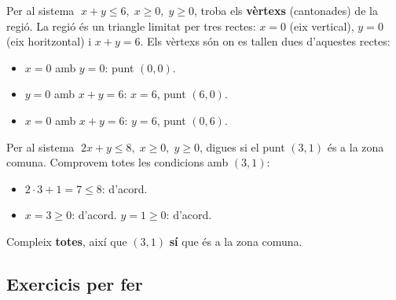 \begin{exresolt}
Per al sistema $\;x+y\le 6,\;x\ge 0,\;y\ge 0$, troba els \textbf{vèrtexs} (cantonades)
de la regió.
\solucio
La regió és un triangle limitat per tres rectes: $x=0$ (eix vertical), $y=0$ (eix
horitzontal) i $x+y=6$. Els vèrtexs són on es tallen dues d'aquestes rectes:
\begin{itemize}[leftmargin=1.4em, itemsep=1pt]
  \item $x=0$ amb $y=0$: punt $(0,0)$.
  \item $y=0$ amb $x+y=6$: $x=6$, punt $(6,0)$.
  \item $x=0$ amb $x+y=6$: $y=6$, punt $(0,6)$.
\end{itemize}
\end{exresolt}

\begin{exresolt}
Per al sistema $\;2x+y\le 8,\;x\ge 0,\;y\ge 0$, digues si el punt $(3,1)$ és a la
zona comuna.
\solucio
Comprovem totes les condicions amb $(3,1)$:
\begin{itemize}[leftmargin=1.4em, itemsep=1pt]
  \item $2\cdot 3+1=7\le 8$: d'acord.
  \item $x=3\ge 0$: d'acord. \quad $y=1\ge 0$: d'acord.
\end{itemize}
Compleix \textbf{totes}, així que $(3,1)$ \textbf{sí} que és a la zona comuna.
\end{exresolt}

\subsection{Exercicis per fer}

